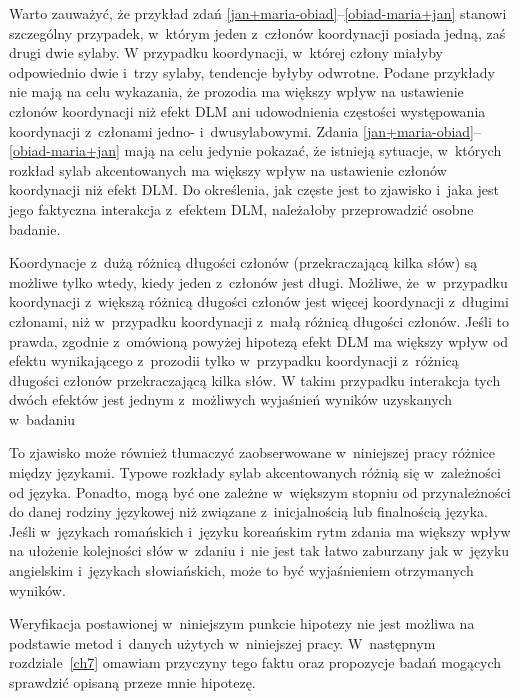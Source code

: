 Warto zauważyć, że przykład zdań \eqref{jan+maria-obiad}--\eqref{obiad-maria+jan} stanowi szczególny przypadek, w~którym jeden z~członów koordynacji posiada jedną, zaś drugi dwie sylaby. W przypadku koordynacji, w~której człony miałyby odpowiednio dwie i~trzy sylaby, tendencje byłyby odwrotne. Podane przykłady nie mają na celu wykazania, że prozodia ma większy wpływ na ustawienie członów koordynacji niż efekt DLM ani udowodnienia częstości występowania koordynacji z~członami jedno- i~dwusylabowymi. Zdania \eqref{jan+maria-obiad}--\eqref{obiad-maria+jan} mają na celu jedynie pokazać, że istnieją sytuacje, w~których rozkład sylab akcentowanych ma większy wpływ na ustawienie członów koordynacji niż efekt DLM. Do określenia, jak częste jest to zjawisko i~jaka jest jego faktyczna interakcja z~efektem DLM, należałoby przeprowadzić osobne badanie.

Koordynacje z~dużą różnicą długości członów (przekraczającą kilka słów) są możliwe tylko wtedy, kiedy jeden z~członów jest długi. Możliwe,  że~w~przypadku koordynacji z~większą różnicą długości członów jest więcej koordynacji z~długimi członami, niż w~przypadku koordynacji z~małą różnicą długości członów. Jeśli to prawda, zgodnie z~omówioną powyżej hipotezą efekt DLM ma większy wpływ od efektu wynikającego z~prozodii tylko w~przypadku koordynacji z~różnicą długości członów przekraczającą kilka słów. W takim przypadku interakcja tych dwóch efektów jest jednym z~możliwych wyjaśnień wyników uzyskanych w~badaniu \citep{przepiorkowski2024argument}

To zjawisko może również tłumaczyć zaobserwowane w~niniejszej pracy różnice między językami. Typowe rozkłady sylab akcentowanych różnią się w~zależności od języka. Ponadto, mogą być one zależne w~większym stopniu od przynależności do danej rodziny językowej niż związane z~inicjalnością lub finalnością języka. Jeśli w~językach romańskich i~języku koreańskim rytm zdania ma większy wpływ na ułożenie kolejności słów w~zdaniu i~nie jest tak łatwo zaburzany jak w~języku angielskim i~językach słowiańskich, może to być wyjaśnieniem otrzymanych wyników.

Weryfikacja postawionej w~niniejszym punkcie hipotezy nie jest możliwa na podstawie metod i~danych użytych w~niniejszej pracy. W~następnym rozdziale~\ref{ch7} omawiam przyczyny tego faktu oraz propozycje badań mogących sprawdzić opisaną przeze mnie hipotezę.
